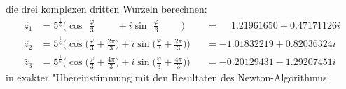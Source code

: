 \begin{beispiel}
die drei komplexen dritten Wurzeln berechnen:
\begin{equation}
\begin{aligned}
\hat{z}_1
&=
5^{\frac16}
\biggl( \cos\phantom{\biggl(} \frac{\varphi}3
	\phantom{+\frac{2\pi}3\biggl)} \,
    +i\sin\phantom{\biggl(} \frac{\varphi}3
	\phantom{+\frac{4\pi}3\biggr)}\,\biggr)
&&=
\phantom{-}1.21961650 + 0.47171126i
\\
\hat{z}_2
&=
5^{\frac16} \biggl(\cos\biggl(\frac{\varphi}3+\frac{2\pi}3\biggr)
+i\sin\biggl(\frac{\varphi}3+\frac{2\pi}3\biggr)\biggr)
&&=
-1.01832219 + 0.82036324i
\\
\hat{z}_3
&=
5^{\frac16} \biggl(\cos\biggl(\frac{\varphi}3+\frac{4\pi}3\biggr)
+i\sin\biggl(\frac{\varphi}3+\frac{4\pi}3\biggr)\biggr)
&&=
-0.20129431 -1.29207451i
\end{aligned}
\end{equation}
in exakter "Ubereinstimmung mit den Resultaten des Newton-Algorithmus.
\end{beispiel}


